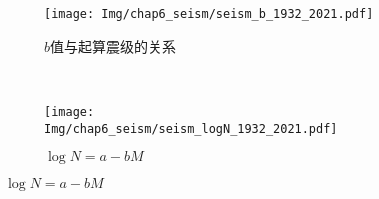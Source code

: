 \begin{figure}[!htbp]
  \centering
  \begin{subfigure}[b]{0.4\textwidth}
    \caption{$b$值与起算震级的关系} 
    \texttt{[image: Img/chap6\_seism/seism\_b\_1932\_2021.pdf]}
    \label{fig:seism_b_m_1932_2021}
  \end{subfigure}   
  ~
  \begin{subfigure}[b]{0.4\textwidth}
      \caption{$\log N=a-bM$}
      \texttt{[image: Img/chap6\_seism/seism\_logN\_1932\_2021.pdf]}
      \label{fig:seism_logn_m_1932_2021}
  \end{subfigure}
  \vspace{-1cm}
  \label{fig:seism_mc_1932_2021}
\end{figure}



